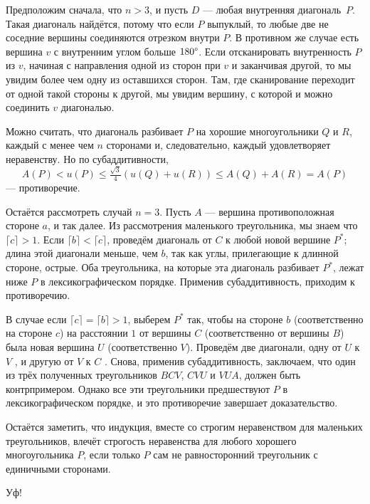 Предположим сначала, что $n>3$, и пусть $D$ --- любая внутренняя диагональ~$P$.
Такая диагональ найдётся, потому что если $P$ выпуклый, то любые две не соседние вершины соединяются отрезком внутри $P$.
В противном же случае есть вершина $v$ с внутренним углом больше $180\degree$.
Если отсканировать внутренность $P$ из $v$, начиная с направления одной из сторон при $v$ и заканчивая другой,
то мы увидим более чем одну из оставшихся сторон.
Там, где сканирование переходит от одной такой стороны к другой, мы увидим вершину, с которой и можно соединить $v$ диагональю.

Можно считать, что диагональ разбивает $P$ на хорошие многоугольники $Q$ и $R$, каждый с менее чем $n$ сторонами и, следовательно, каждый удовлетворяет неравенству.
Но по субаддитивности, 
\[A(P)<u(P)\leqslant \tfrac{\sqrt{3}}4(u(Q)+u(R))\leqslant A(Q)+A(R)=A(P)\]
--- противоречие.

Остаётся рассмотреть случай $n=3$.
Пусть $A$ --- вершина противоположная стороне $a$, и так далее.
Из рассмотрения маленького треугольника, мы знаем что $\lceil c\rceil>1$.
Если $\lceil b\rceil<\lceil c\rceil$, проведём диагональ от $C$ к любой новой вершине $P^*$;
длина этой диагонали меньше, чем $b$, так как углы, прилегающие к длинной стороне, острые.
Оба треугольника, на которые эта диагональ разбивает $P^*$, лежат ниже $P$ в лексикографическом порядке.
Применив субаддитивность, приходим к противоречию.

В случае если $\lceil c\rceil=\lceil b\rceil>1$, выберем $P^*$ так, чтобы на стороне $b$ (соответственно на стороне $c$) на расстоянии $1$ от вершины $C$ (соответственно от вершины $B$) была новая вершина $U$ (соответственно $V$).
Проведём две диагонали, одну от $U$ к $V$%
, и другую от $V$ к $C$%
.
Снова, применив субаддитивность, заключаем, что один из трёх полученных треугольников $BCV$, $CVU$ и $VUA$, должен быть контрпримером.
Однако все эти треугольники предшествуют $P$ в лексикографическом порядке, и это противоречие завершает доказательство.

Остаётся заметить, что индукция, вместе со строгим неравенством для маленьких треугольников, влечёт строгость неравенства для любого хорошего многоугольника $P$, если только $P$ сам не равносторонний треугольник с единичными сторонами.

Уф!
